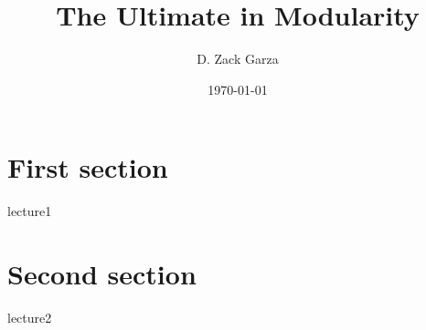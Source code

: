 \documentclass{article}
\title{The Ultimate in Modularity}
\author{D. Zack Garza}
\date{\today}
\begin{document}
 
    \maketitle
 
    \section{First section}
    {lecture1}
 
    \section{Second section}
    {lecture2}
 
\end{document}
